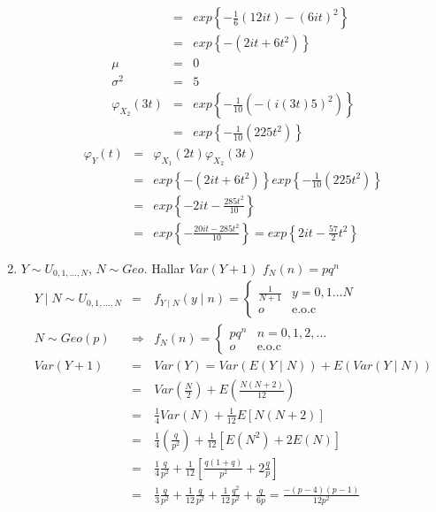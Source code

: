 \begin{enumerate}
\begin{eqnarray*}
 &=& exp \left\{- \frac{1}{6} \left(12it \right) - \left( 6it\right)^2 \right\}\\
 &=& exp \left\{- \left(2it + 6t^2 \right) \right\}\\
 \mu &=& 0\\
 \sigma^2 &=& 5\\
 \varphi _{X_{2}}\left(3t \right) &=& exp \left\{ - \frac{1}{10} \left(- \left( i \left(3t \right)5\right)^2 \right) \right\}\\
 &=& exp \left\{ - \frac{1}{10} \left(225t^2 \right)\right\}
 \end{eqnarray*} 
  \begin{eqnarray*} 
  \varphi_{Y} \left(t \right)&=& \varphi_{X_{1}} \left(2t \right)\varphi_{X_{2}} \left(3t \right)\\
  &=& exp \left\{- \left(2it + 6t^2 \right) \right\} exp \left\{- \frac{1}{10}\left(225t^2 \right) \right\} \\
  &=& exp \left\{ -2it - \frac{285t^2}{10} \right\}\\
  &=& exp \left\{ - \frac{20it - 285t^2}{10} \right\} = exp \left\{ 2it - \frac{57}{2} t^2 \right\}
   \end{eqnarray*} 
   \item $Y \sim U_{0,1,\ldots, N }$, $N \sim Geo$. Hallar $Var \left( Y+1 \right)$ $f_{N} \left(n \right)= pq^{n}$
   \begin{eqnarray*}
   Y\mid N \sim U_{0,1, \ldots,N }&=& f_{Y\mid N} \left( y \mid n \right) = \begin{cases}
   \frac{1}{N+1} & y=0,1 \ldots N  \\   o & \textrm{e.o.c}
   \end{cases}\\
   N \sim Geo \left(p \right) &\Rightarrow& f_{N} \left( n \right) = 
 \begin{cases}
   pq^n & n=0,1,2, \ldots\\
   o & \textrm{e.o.c}
   \end{cases}\\  
   Var \left(Y+1 \right)&=& Var \left(Y \right) = Var \left( E \left(Y \mid N \right) \right)+ E \left( Var \left(Y \mid N \right) \right)\\
   &=& Var \left( \frac{N}{2} \right)+ E \left( \frac{N \left(N+2 \right) }{12 }\right)\\
   &=& \frac{1}{4} Var \left(N \right)+ \frac{1}{12} E \left[ N \left(N+2 \right) \right]\\
   &=& \frac{1}{4} \left(\frac{q}{p^2} \right)+ \frac{1}{12} \left[E \left(N^2 \right)+ 2E \left(N \right) \right]\\
   &=& \frac{1}{4} \frac{q}{p^2} + \frac{1}{12} \left[ \frac{q \left(1+q \right) }{p^2} + 2 \frac{q}{p} \right]\\
   &=& \frac{1}{3} \frac{q}{p^2}+ \frac{1}{12} \frac{q}{p^2}+ \frac{1}{12} \frac{q^2}{p^2}+ \frac{q}{6p}= \frac{- \left(p-4 \right)\left(p-1\right) }{12p^2} 
\end{eqnarray*}
\end{enumerate}


